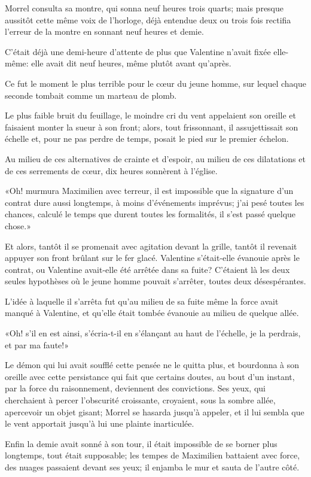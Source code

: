 Morrel consulta sa montre, qui sonna neuf heures trois quarts; mais presque aussitôt cette même voix de l'horloge, déjà entendue deux ou trois fois rectifia l'erreur de la montre en sonnant neuf heures et demie. 

C'était déjà une demi-heure d'attente de plus que Valentine n'avait fixée elle-même: elle avait dit neuf heures, même plutôt avant qu'après. 

Ce fut le moment le plus terrible pour le cœur du jeune homme, sur lequel chaque seconde tombait comme un marteau de plomb. 

Le plus faible bruit du feuillage, le moindre cri du vent appelaient son oreille et faisaient monter la sueur à son front; alors, tout frissonnant, il assujettissait son échelle et, pour ne pas perdre de temps, posait le pied sur le premier échelon. 

Au milieu de ces alternatives de crainte et d'espoir, au milieu de ces dilatations et de ces serrements de cœur, dix heures sonnèrent à l'église. 

«Oh! murmura Maximilien avec terreur, il est impossible que la signature d'un contrat dure aussi longtemps, à moins d'événements imprévus; j'ai pesé toutes les chances, calculé le temps que durent toutes les formalités, il s'est passé quelque chose.» 

Et alors, tantôt il se promenait avec agitation devant la grille, tantôt il revenait appuyer son front brûlant sur le fer glacé. Valentine s'était-elle évanouie après le contrat, ou Valentine avait-elle été arrêtée dans sa fuite? C'étaient là les deux seules hypothèses où le jeune homme pouvait s'arrêter, toutes deux désespérantes. 

L'idée à laquelle il s'arrêta fut qu'au milieu de sa fuite même la force avait manqué à Valentine, et qu'elle était tombée évanouie au milieu de quelque allée. 

«Oh! s'il en est ainsi, s'écria-t-il en s'élançant au haut de l'échelle, je la perdrais, et par ma faute!» 

Le démon qui lui avait soufflé cette pensée ne le quitta plus, et bourdonna à son oreille avec cette persistance qui fait que certains doutes, au bout d'un instant, par la force du raisonnement, deviennent des convictions. Ses yeux, qui cherchaient à percer l'obscurité croissante, croyaient, sous la sombre allée, apercevoir un objet gisant; Morrel se hasarda jusqu'à appeler, et il lui sembla que le vent apportait jusqu'à lui une plainte inarticulée. 

Enfin la demie avait sonné à son tour, il était impossible de se borner plus longtemps, tout était supposable; les tempes de Maximilien battaient avec force, des nuages passaient devant ses yeux; il enjamba le mur et sauta de l'autre côté. 

